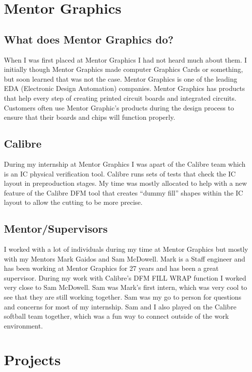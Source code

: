 \documentclass[letterpaper,10pt,notitlepage,fleqn]{article}
\begin{document}
\section{Mentor Graphics}

\subsection{What does Mentor Graphics do?}
\indent When I was first placed at Mentor Graphics I had not heard much about them. I initially 
though Mentor Graphics made computer Graphics Cards or something, but soon learned 
that was not the case. Mentor Graphics is one of the leading EDA (Electronic Design Automation)
companies. Mentor Graphics has products that help every step of creating printed 
circuit boards and integrated circuits. Customers often use Mentor Graphic's products 
during the design process to ensure that their boards and chips will function properly. 

\subsection{Calibre}
\indent During my internship at Mentor Graphics I was apart of the Calibre team which is 
an IC physical verification tool. Calibre runs sets of tests that check 
the IC layout in pre\-production stages. My time was mostly allocated to help with 
a new feature of the Calibre DFM tool that creates ``dummy fill'' shapes within 
the IC layout to allow the cutting to be more precise. 

\subsection{Mentor/Supervisors}
\indent I worked with a lot of individuals during my time at Mentor Graphics but mostly with 
my Mentors Mark Gaidos and Sam McDowell. Mark is a Staff engineer and has been working 
at Mentor Graphics for 27 years and has been a great supervisor. During my work with 
Calibre's DFM FILL WRAP function I worked very close to Sam McDowell. Sam was Mark's 
first intern, which was very cool to see that they are still working together. Sam 
was my go to person for questions and concerns for most of my internship. Sam and 
I also played on the Calibre softball team together, which was a fun way to connect 
outside of the work environment.

\section{Projects}
\end{document}
